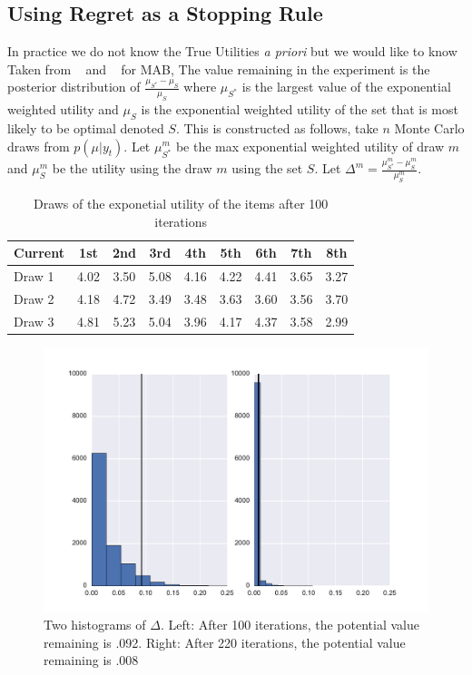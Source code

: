 \documentclass[mksc,blindrev]{informs3} %
\begin{document}
\subsection{Using Regret as a Stopping Rule}
In practice we do not know the True Utilities \textit{a priori} but we would like to know 
Taken from ~\cite{scott2015multi} and ~\cite{scott2010modern} for MAB, The value remaining in the experiment is the posterior distribution of $\frac{\mu_{S^*}-\mu_{S}}{\mu_{S}}$ where $\mu_{S^*}$ is the largest value of the exponential weighted utility and $\mu_{S}$ is the exponential weighted utility of the set that is most likely to be optimal denoted $S$. This is constructed as follows, take $n$ Monte Carlo draws from $p(\mu|y_t)$. Let $\mu_{S^*}^{m}$ be the max exponential weighted utility of draw $m$ and $\mu_{S}^{m}$ be the utility using the draw $m$ using the set $S$. Let $\Delta^{m}=\frac{\mu^m_{S^*}-\mu^m_{S}}{\mu^m_{S}}$.\\
\begin{table}
\begin{center}
\begin{tabular}{l | c c c c c c c c}
Current & 1st &  2nd  &  3rd  &  4th &  5th & 6th & 7th &  8th \\
\hline
Draw 1 & 4.02 &  3.50 &  5.08 & 4.16&  4.22 & 4.41 & 3.65 &  3.27 \\
Draw 2 &4.18 & 4.72 & 3.49 & 3.48 & 3.63 & 3.60 & 3.56 &  3.70 \\
Draw 3 &4.81 & 5.23 & 5.04 &  3.96 &  4.17 & 4.37 &  3.58 & 2.99 \\ 
\end{tabular}
\end{center}
\caption{Draws of the exponetial utility of the items after 100 iterations}
\label{table:data}
\end{table}

\begin{figure}
\includegraphics[width=1\linewidth]{plots/valremhist.pdf}
\caption{Two histograms of $\Delta$. Left: After 100 iterations, the potential value remaining is .092. Right: After 220 iterations, the potential value remaining is .008}
\label{fig:data}
\end{figure}
\end{document}
